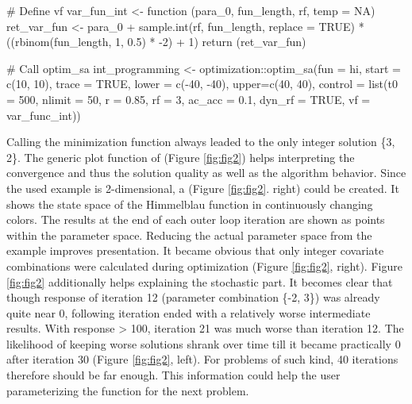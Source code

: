 \begin{example}
# Define vf
var_fun_int <- function (para_0, fun_length, rf, temp = NA) {
    ret_var_fun <- para_0 + sample.int(rf, fun_length, replace = TRUE) *
        ((rbinom(fun_length, 1, 0.5) * -2) + 1)
    return (ret_var_fun)
}

# Call optim_sa
int_programming <- optimization::optim_sa(fun = hi, start = c(10, 10), trace = TRUE, 
                                          lower = c(-40, -40), upper=c(40, 40),
                                          control = list(t0 = 500, nlimit = 50,
                                          r = 0.85, rf = 3, ac_acc = 0.1, 
                                          dyn_rf = TRUE, vf = var_func_int))
\end{example}

Calling the minimization function always leaded to the only integer solution \{3, 2\}. The generic plot function of  (Figure \ref{fig:fig2}) helps interpreting the convergence and thus the solution quality as well as the algorithm behavior. Since the used example is 2-dimensional, a  (Figure \ref{fig:fig2}. right) could be created. It shows the state space of the Himmelblau function in continuously changing colors. The results at the end of each outer loop iteration are shown as points within the parameter space. Reducing the actual parameter space from the example improves presentation. It became obvious that only integer covariate combinations were calculated during optimization (Figure \ref{fig:fig2}, right). Figure \ref{fig:fig2} additionally helps explaining the stochastic part. It becomes clear that though response of iteration 12 (parameter combination \{-2, 3\}) was already quite near 0, following iteration ended with a relatively worse intermediate results. With response > 100, iteration 21 was much worse than iteration 12. The likelihood of keeping worse solutions shrank over time till it became practically 0 after iteration 30 (Figure \ref{fig:fig2}, left). For problems of such kind, 40 iterations therefore should be far enough. This information could help the user parameterizing the function for the next problem.

